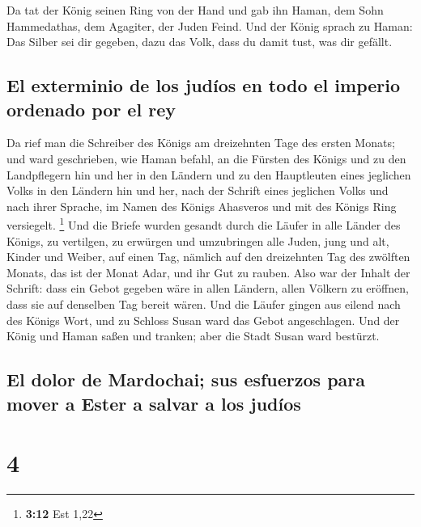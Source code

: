  Da tat der König seinen Ring von der Hand und gab ihn
Haman, dem Sohn Hammedathas, dem Agagiter, der Juden Feind.
 Und der König sprach zu Haman: Das Silber sei dir
gegeben, dazu das Volk, dass du damit tust, was dir gefällt.

\hypertarget{el-exterminio-de-los-juduxedos-en-todo-el-imperio-ordenado-por-el-rey}{%
\subsection{El exterminio de los judíos en todo el imperio ordenado por
el
rey}\label{el-exterminio-de-los-juduxedos-en-todo-el-imperio-ordenado-por-el-rey}}

 Da rief man die Schreiber des Königs am dreizehnten Tage
des ersten Monats; und ward geschrieben, wie Haman befahl, an die
Fürsten des Königs und zu den Landpflegern hin und her in den Ländern
und zu den Hauptleuten eines jeglichen Volks in den Ländern hin und her,
nach der Schrift eines jeglichen Volks und nach ihrer Sprache, im Namen
des Königs Ahasveros und mit des Königs Ring versiegelt. \footnote{\textbf{3:12}
  Est 1,22}  Und die Briefe wurden gesandt durch die
Läufer in alle Länder des Königs, zu vertilgen, zu erwürgen und
umzubringen alle Juden, jung und alt, Kinder und Weiber, auf einen Tag,
nämlich auf den dreizehnten Tag des zwölften Monats, das ist der Monat
Adar, und ihr Gut zu rauben.  Also war der Inhalt der
Schrift: dass ein Gebot gegeben wäre in allen Ländern, allen Völkern zu
eröffnen, dass sie auf denselben Tag bereit wären.  Und
die Läufer gingen aus eilend nach des Königs Wort, und zu Schloss Susan
ward das Gebot angeschlagen. Und der König und Haman saßen und tranken;
aber die Stadt Susan ward bestürzt.

\hypertarget{el-dolor-de-mardochai-sus-esfuerzos-para-mover-a-ester-a-salvar-a-los-juduxedos}{%
\subsection{El dolor de Mardochai; sus esfuerzos para mover a Ester a
salvar a los
judíos}\label{el-dolor-de-mardochai-sus-esfuerzos-para-mover-a-ester-a-salvar-a-los-juduxedos}}

\hypertarget{section-3}{%
\section{4}\label{section-3}}

